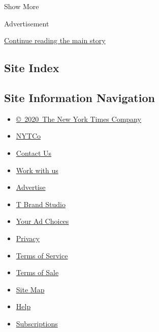 Show More

Advertisement

\protect\hyperlink{after-mid2}{Continue reading the main story}

\hypertarget{site-index}{%
\subsection{Site Index}\label{site-index}}

\hypertarget{site-information-navigation}{%
\subsection{Site Information
Navigation}\label{site-information-navigation}}

\begin{itemize}
\tightlist
\item
  \href{https://help.nytimes.com/hc/en-us/articles/115014792127-Copyright-notice}{©~2020~The
  New York Times Company}
\end{itemize}

\begin{itemize}
\tightlist
\item
  \href{https://www.nytco.com/}{NYTCo}
\item
  \href{https://help.nytimes.com/hc/en-us/articles/115015385887-Contact-Us}{Contact
  Us}
\item
  \href{https://www.nytco.com/careers/}{Work with us}
\item
  \href{https://nytmediakit.com/}{Advertise}
\item
  \href{http://www.tbrandstudio.com/}{T Brand Studio}
\item
  \href{https://www.nytimes.com/privacy/cookie-policy\#how-do-i-manage-trackers}{Your
  Ad Choices}
\item
  \href{https://www.nytimes.com/privacy}{Privacy}
\item
  \href{https://help.nytimes.com/hc/en-us/articles/115014893428-Terms-of-service}{Terms
  of Service}
\item
  \href{https://help.nytimes.com/hc/en-us/articles/115014893968-Terms-of-sale}{Terms
  of Sale}
\item
  \href{https://spiderbites.nytimes.com}{Site Map}
\item
  \href{https://help.nytimes.com/hc/en-us}{Help}
\item
  \href{https://www.nytimes.com/subscription?campaignId=37WXW}{Subscriptions}
\end{itemize}
